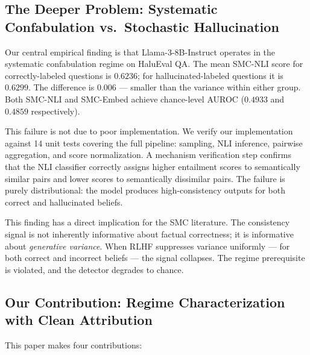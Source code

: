 \subsection{The Deeper Problem: Systematic Confabulation vs.\ Stochastic Hallucination}

Our central empirical finding is that Llama-3-8B-Instruct \cite{Meta2024Llama3} operates in the systematic confabulation regime on HaluEval QA. The mean SMC-NLI score for correctly-labeled questions is $0.6236$; for hallucinated-labeled questions it is $0.6299$. The difference is $0.006$ --- smaller than the variance within either group. Both SMC-NLI and SMC-Embed achieve chance-level AUROC ($0.4933$ and $0.4859$ respectively).

This failure is not due to poor implementation. We verify our implementation against 14 unit tests covering the full pipeline: sampling, NLI inference, pairwise aggregation, and score normalization. A mechanism verification step confirms that the NLI classifier correctly assigns higher entailment scores to semantically similar pairs and lower scores to semantically dissimilar pairs. The failure is purely distributional: the model produces high-consistency outputs for both correct and hallucinated beliefs.

This finding has a direct implication for the SMC literature. The consistency signal is not inherently informative about factual correctness; it is informative about \emph{generative variance}. When RLHF suppresses variance uniformly --- for both correct and incorrect beliefs --- the signal collapses. The regime prerequisite is violated, and the detector degrades to chance.

\subsection{Our Contribution: Regime Characterization with Clean Attribution}

This paper makes four contributions:

